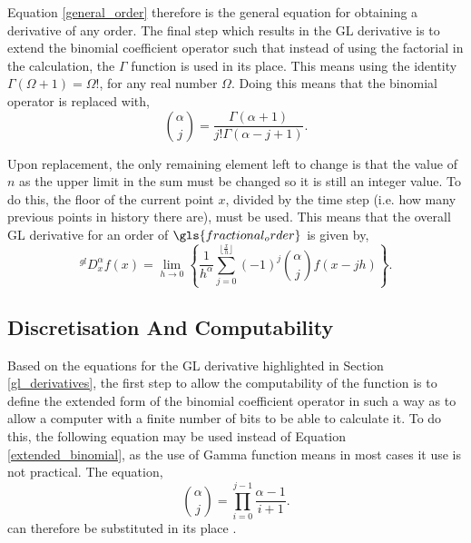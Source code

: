 Equation \ref{general_order} therefore is the general equation for obtaining a derivative of any order. The final step which results in the GL derivative is to extend the binomial coefficient operator such that instead of using the factorial in the calculation, the $\Gamma$ function is used in its place. This means using the identity $\Gamma(\Omega+1) = \Omega!$, for any real number $\Omega$. Doing this means that the binomial operator is replaced with,
\begin{equation}\label{extended_binomial}
	{\alpha \choose j} = \frac{\Gamma(\alpha + 1)}{j!\Gamma(\alpha-j+1)}.
\end{equation}

Upon replacement, the only remaining element left to change is that the value of $n$ as the upper limit in the sum must be changed so it is still an integer value. To do this, the floor of the current point $x$, divided by the time step (i.e. how many previous points in history there are), must be used. This means that the overall GL derivative for an order of $\gls{fractional_order}$ is given by,
\begin{equation}\label{gl_order}
	^{gl}D^{\alpha}_{x}f(x) = \lim_{h \to 0} \left\{\frac{1}{h^{\alpha}}\sum_{j=0}^{\lfloor\frac{x}{h}\rfloor} (-1)^{j} {\alpha \choose j} f(x-jh)\right\}.
\end{equation}

\subsection{Discretisation And Computability}

Based on the equations for the GL derivative highlighted in Section \ref{gl_derivatives}, the first step to allow the computability of the function is to define the extended form of the binomial coefficient operator in such a way as to allow a computer with a finite number of bits to be able to calculate it. To do this, the following equation may be used instead of Equation \ref{extended_binomial}, as the use of Gamma function means in most cases it use is not practical. The equation,
\begin{equation}\label{computable_extended_binomial}
	{\alpha \choose j} = \prod_{i=0}^{j-1}\frac{\alpha-1}{i+1}.
\end{equation}
can therefore be substituted in its place \cite{Fractional_calculus_in_pharmacokinetics}. 


